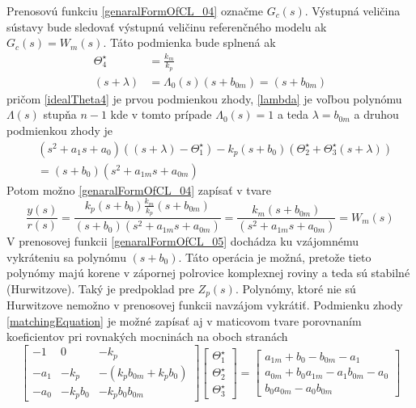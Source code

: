 \documentclass[a4paper, 10pt, ]{article}
\begin{document}
Prenosovú funkciu \eqref{genaralFormOfCL_04} označme $G_c(s)$. Výstupná veličina sústavy bude sledovať výstupnú veličinu referenčného modelu ak $G_c(s) = W_m(s)$. Táto podmienka bude splnená ak
\begin{align}
	\Theta_4^\star &= \frac{k_m}{k_p} \label{idealTheta4} \\
	(s + \lambda) &= \Lambda_0(s) (s + b_{0m}) = (s + b_{0m}) \label{lambda}
\end{align}
pričom \eqref{idealTheta4} je prvou podmienkou zhody, \eqref{lambda} je voľbou polynómu $\Lambda(s)$ stupňa $n-1$ kde v tomto prípade $\Lambda_0(s) = 1$ a teda $\lambda = b_{0m}$ a druhou podmienkou zhody je
\begin{equation} \label{matchingEquation}
    \begin{split}
    	&(s^2 + a_1 s + a_0)
    	\left( (s + \lambda) - \Theta_1^\star \right)
    	-
    	k_p
    	(s + b_0)
    	\left( \Theta_2^\star + \Theta_3^\star (s + \lambda) \right)
    	\\&=
    	(s + b_0)   ( s^2 + a_{1m} s + a_{0m})
    \end{split}
\end{equation}
Potom možno \eqref{genaralFormOfCL_04} zapísať v tvare
\begin{equation} \label{genaralFormOfCL_05}
	\frac{y(s)}{r(s)}
	=
	\frac{
		k_p
		(s + b_0)
		\frac{k_m}{k_p}
		(s + b_{0m})
		}{
		(s + b_0)
		( s^2 + a_{1m} s + a_{0m})}
	=
	\frac{
		k_m
		(s + b_{0m})
		}{
		( s^2 + a_{1m} s + a_{0m})}
	=
	W_m(s)
\end{equation}
V prenosovej funkcii \eqref{genaralFormOfCL_05} dochádza ku vzájomnému  vykráteniu sa polynómu $(s + b_0)$. Táto operácia je možná, pretože tieto polynómy majú korene v zápornej polrovice komplexnej roviny a teda sú stabilné (Hurwitzove). Taký je predpoklad pre $Z_p(s)$. Polynómy, ktoré nie sú Hurwitzove nemožno v prenosovej funkcii navzájom vykrátiť. Podmienku zhody \eqref{matchingEquation} je možné zapísať aj v maticovom tvare porovnaním koeficientov pri rovnakých mocninách na oboch stranách
\begin{equation} \label{idealParameters}
	\begin{bmatrix}
		-1 & 0 & -k_p \\
		-a_1 & -k_p & -(k_p b_{0m} + k_p b_0) \\
		-a_0 & -k_p b_0 & -k_p b_0 b_{0m}
	\end{bmatrix}
	\begin{bmatrix}
    	  \Theta_1^\star \\
		  \Theta_2^\star \\
		  \Theta_3^\star
 	\end{bmatrix}
	=
	\begin{bmatrix}
    	a_{1m} + b_0 - b_{0m} - a_1 \\
    	a_{0m} + b_0 a_{1m} - a_1 b_{0m} - a_0 \\
    	b_0 a_{0m} - a_0 b_{0m}
  	\end{bmatrix}
\end{equation}
\end{document}

